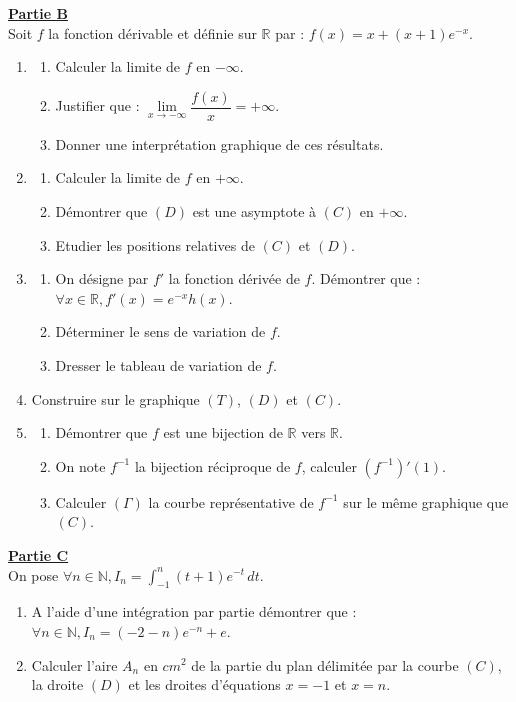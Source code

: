 \documentclass[12pt,a4paper]{article}
\begin{document}
\noindent \underline{\textbf{Partie B}} \\
Soit $f$ la fonction dérivable et définie sur $\mathbb{R}$ par : $f(x) = x + (x + 1)e^{-x}$.
\begin{enumerate}
    \item \begin{enumerate}
        \item Calculer la limite de $f$ en $-\infty$.
        \item Justifier que : $\lim\limits_{x \to -\infty} \dfrac{f(x)}{x} = +\infty$.
        \item Donner une interprétation graphique de ces résultats.
    \end{enumerate}
    \item \begin{enumerate}
        \item Calculer la limite de $f$ en $+\infty$.
        \item Démontrer que $(D)$ est une asymptote à $(C)$ en $+\infty$.
        \item Etudier les positions relatives de $(C)$ et $(D)$.
    \end{enumerate}
    \item \begin{enumerate}
        \item On désigne par $f'$ la fonction dérivée de $f$. Démontrer que : $\forall x \in \mathbb{R} , f'(x) = e^{-x}h(x)$.
        \item Déterminer le sens de variation de $f$.
        \item Dresser le tableau de variation de $f$.
    \end{enumerate}
    \item Construire sur le graphique $(T)$, $(D)$ et $(C)$.
    \item \begin{enumerate}
        \item Démontrer que $f$ est une bijection de $\mathbb{R}$ vers $\mathbb{R}$.
        \item On note $f^{-1}$ la bijection réciproque de $f$, calculer $(f^{-1})'(1)$.
        \item Calculer $(\Gamma)$ la courbe représentative de $f^{-1}$ sur le même graphique que $(C)$.
    \end{enumerate}
\end{enumerate}

\vspace{0.5cm}

\noindent \underline{\textbf{Partie C}} \\
On pose $\forall n \in \mathbb{N} , I_n = \int_{-1}^{n} (t + 1)e^{-t} \, dt$.
\begin{enumerate}
    \item A l'aide d'une intégration par partie démontrer que : \\
    $\forall n \in \mathbb{N} , I_n = (-2 - n)e^{-n} + e$.
    \item Calculer l'aire $A_n$ en $cm^2$ de la partie du plan délimitée par la courbe $(C)$, la droite $(D)$ et les droites d'équations $x = -1$ et $x = n$.
\end{enumerate}
\end{document}
